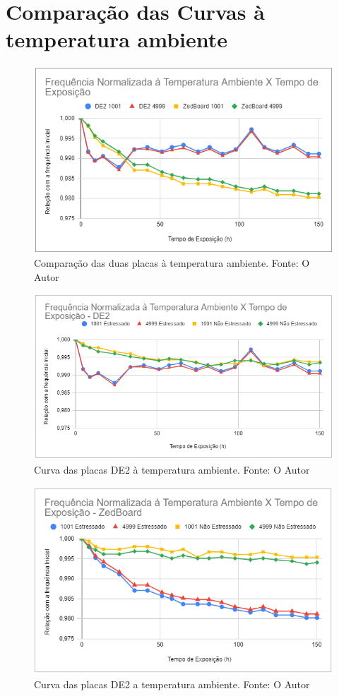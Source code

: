 \section{Comparação das Curvas à temperatura ambiente}

\begin{figure}[H]
    \centering
    \includegraphics[scale=0.75]{figures/Resultados/TAmbEstressadas}
    \caption{Comparação das duas placas à temperatura ambiente. Fonte: O Autor}
    \label{fig:TAmbEstressadas}
\end{figure}

\begin{figure}[H]
    \centering
    \includegraphics[scale=0.75]{figures/Resultados/TAmbDE2}
    \caption{Curva das placas DE2 à temperatura ambiente. Fonte: O Autor}
    \label{fig:TAmbDE2}
\end{figure}

\begin{figure}[H]
    \centering
    \includegraphics[scale=0.75]{figures/Resultados/TAmbZedBoard}
    \caption{Curva das placas DE2 a temperatura ambiente. Fonte: O Autor}
    \label{fig:TAmbZedBoard}
\end{figure}